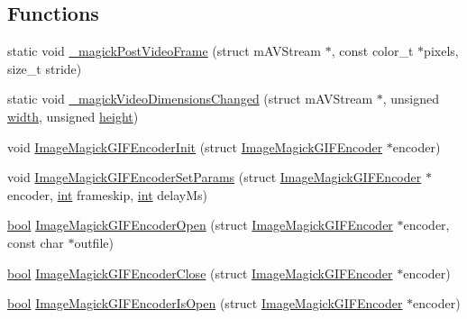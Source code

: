 \subsection*{Functions}
\begin{DoxyCompactItemize}
\item 
static void \mbox{\hyperlink{imagemagick-gif-encoder_8c_a90fcc60d0fb6e6dc2c5279773d876161}{\+\_\+magick\+Post\+Video\+Frame}} (struct m\+A\+V\+Stream $\ast$, const color\+\_\+t $\ast$pixels, size\+\_\+t stride)
\item 
static void \mbox{\hyperlink{imagemagick-gif-encoder_8c_a22ece06be91b078780d4bf4306bc93e2}{\+\_\+magick\+Video\+Dimensions\+Changed}} (struct m\+A\+V\+Stream $\ast$, unsigned \mbox{\hyperlink{readppm_8c_a59b7c57bf1dc7c36ac7c8232cf5bb713}{width}}, unsigned \mbox{\hyperlink{readppm_8c_ac8b624a7354198da45f5797b93b883c9}{height}})
\item 
void \mbox{\hyperlink{imagemagick-gif-encoder_8c_a09cc198e1bf6838fe97da63133398315}{Image\+Magick\+G\+I\+F\+Encoder\+Init}} (struct \mbox{\hyperlink{imagemagick-gif-encoder_8h_struct_image_magick_g_i_f_encoder}{Image\+Magick\+G\+I\+F\+Encoder}} $\ast$encoder)
\item 
void \mbox{\hyperlink{imagemagick-gif-encoder_8c_a40b53230d8a8b3b36048085d06d9d029}{Image\+Magick\+G\+I\+F\+Encoder\+Set\+Params}} (struct \mbox{\hyperlink{imagemagick-gif-encoder_8h_struct_image_magick_g_i_f_encoder}{Image\+Magick\+G\+I\+F\+Encoder}} $\ast$encoder, \mbox{\hyperlink{ioapi_8h_a787fa3cf048117ba7123753c1e74fcd6}{int}} frameskip, \mbox{\hyperlink{ioapi_8h_a787fa3cf048117ba7123753c1e74fcd6}{int}} delay\+Ms)
\item 
\mbox{\hyperlink{libretro_8h_a4a26dcae73fb7e1528214a068aca317e}{bool}} \mbox{\hyperlink{imagemagick-gif-encoder_8c_ad1c19071d722aa4826774e1f179b3f57}{Image\+Magick\+G\+I\+F\+Encoder\+Open}} (struct \mbox{\hyperlink{imagemagick-gif-encoder_8h_struct_image_magick_g_i_f_encoder}{Image\+Magick\+G\+I\+F\+Encoder}} $\ast$encoder, const char $\ast$outfile)
\item 
\mbox{\hyperlink{libretro_8h_a4a26dcae73fb7e1528214a068aca317e}{bool}} \mbox{\hyperlink{imagemagick-gif-encoder_8c_afbb1ff524c5364a4e5470189f8501204}{Image\+Magick\+G\+I\+F\+Encoder\+Close}} (struct \mbox{\hyperlink{imagemagick-gif-encoder_8h_struct_image_magick_g_i_f_encoder}{Image\+Magick\+G\+I\+F\+Encoder}} $\ast$encoder)
\item 
\mbox{\hyperlink{libretro_8h_a4a26dcae73fb7e1528214a068aca317e}{bool}} \mbox{\hyperlink{imagemagick-gif-encoder_8c_a05aba14b683c69c288b19fb794847dfc}{Image\+Magick\+G\+I\+F\+Encoder\+Is\+Open}} (struct \mbox{\hyperlink{imagemagick-gif-encoder_8h_struct_image_magick_g_i_f_encoder}{Image\+Magick\+G\+I\+F\+Encoder}} $\ast$encoder)
\end{DoxyCompactItemize}


